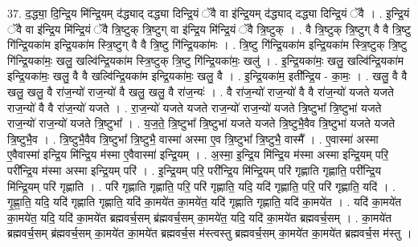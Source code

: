 \documentclass[17pt]{extarticle}
\begin{document}
37. द॒द्ध्या॒ दि॒न्द्रि॒य मि॑न्द्रि॒यम् द॑द्ध्याद् दद्ध्या दिन्द्रि॒यं ॅवै वा इ॑न्द्रि॒यम् द॑द्ध्याद् दद्ध्या दिन्द्रि॒यं ॅवै । . इ॒न्द्रि॒यं ॅवै वा इ॑न्द्रि॒य मि॑न्द्रि॒यं ॅवै त्रि॒ष्टुक् त्रि॒ष्टुग् वा इ॑न्द्रि॒य मि॑न्द्रि॒यं ॅवै त्रि॒ष्टुक् । . वै त्रि॒ष्टुक् त्रि॒ष्टुग् वै वै त्रि॒ष्टु गि॑न्द्रि॒यका॑म इन्द्रि॒यका॑म स्त्रि॒ष्टुग् वै वै त्रि॒ष्टु गि॑न्द्रि॒यका॑मः । . त्रि॒ष्टु गि॑न्द्रि॒यका॑म इन्द्रि॒यका॑म स्त्रि॒ष्टुक् त्रि॒ष्टु गि॑न्द्रि॒यका॑मः॒ खलु॒ खल्वि॑न्द्रि॒यका॑म स्त्रि॒ष्टुक् त्रि॒ष्टु गि॑न्द्रि॒यका॑मः॒ खलु॑ । . इ॒न्द्रि॒यका॑मः॒ खलु॒ खल्वि॑न्द्रि॒यका॑म इन्द्रि॒यका॑मः॒ खलु॒ वै वै खल्वि॑न्द्रि॒यका॑म इन्द्रि॒यका॑मः॒ खलु॒ वै । . इ॒न्द्रि॒यका॑म॒ इती᳚न्द्रि॒य - का॒मः॒ । . खलु॒ वै वै खलु॒ खलु॒ वै रा॑ज॒न्यो॑ राज॒न्यो॑ वै खलु॒ खलु॒ वै रा॑ज॒न्यः॑ । . वै रा॑ज॒न्यो॑ राज॒न्यो॑ वै वै रा॑ज॒न्यो॑ यजते यजते राज॒न्यो॑ वै वै रा॑ज॒न्यो॑ यजते । . रा॒ज॒न्यो॑ यजते यजते राज॒न्यो॑ राज॒न्यो॑ यजते त्रि॒ष्टुभा᳚ त्रि॒ष्टुभा॑ यजते राज॒न्यो॑ राज॒न्यो॑ यजते त्रि॒ष्टुभा᳚ । . य॒ज॒ते॒ त्रि॒ष्टुभा᳚ त्रि॒ष्टुभा॑ यजते यजते त्रि॒ष्टुभै॒वैव त्रि॒ष्टुभा॑ यजते यजते त्रि॒ष्टुभै॒व । . त्रि॒ष्टुभै॒वैव त्रि॒ष्टुभा᳚ त्रि॒ष्टुभै॒ वास्मा॑ अस्मा ए॒व त्रि॒ष्टुभा᳚ त्रि॒ष्टुभै॒ वास्मै᳚ । . ए॒वास्मा॑ अस्मा ए॒वैवास्मा॑ इन्द्रि॒य मि॑न्द्रि॒य म॑स्मा ए॒वैवास्मा॑ इन्द्रि॒यम् । . अ॒स्मा॒ इ॒न्द्रि॒य मि॑न्द्रि॒य म॑स्मा अस्मा इन्द्रि॒यम् परि॒ परी᳚न्द्रि॒य म॑स्मा अस्मा इन्द्रि॒यम् परि॑ । . इ॒न्द्रि॒यम् परि॒ परी᳚न्द्रि॒य मि॑न्द्रि॒यम् परि॑ गृह्णाति गृह्णाति॒ परी᳚न्द्रि॒य मि॑न्द्रि॒यम् परि॑ गृह्णाति । . परि॑ गृह्णाति गृह्णाति॒ परि॒ परि॑ गृह्णाति॒ यदि॒ यदि॑ गृह्णाति॒ परि॒ परि॑ गृह्णाति॒ यदि॑ । . गृ॒ह्णा॒ति॒ यदि॒ यदि॑ गृह्णाति गृह्णाति॒ यदि॑ का॒मये॑त का॒मये॑त॒ यदि॑ गृह्णाति गृह्णाति॒ यदि॑ का॒मये॑त । . यदि॑ का॒मये॑त का॒मये॑त॒ यदि॒ यदि॑ का॒मये॑त ब्रह्मवर्च॒सम् ब्र॑ह्मवर्च॒सम् का॒मये॑त॒ यदि॒ यदि॑ का॒मये॑त ब्रह्मवर्च॒सम् । . का॒मये॑त ब्रह्मवर्च॒सम् ब्र॑ह्मवर्च॒सम् का॒मये॑त का॒मये॑त ब्रह्मवर्च॒स म॑स्त्वस्तु ब्रह्मवर्च॒सम् का॒मये॑त का॒मये॑त ब्रह्मवर्च॒स म॑स्तु । \newline
\pagebreak
{}
\end{document}
